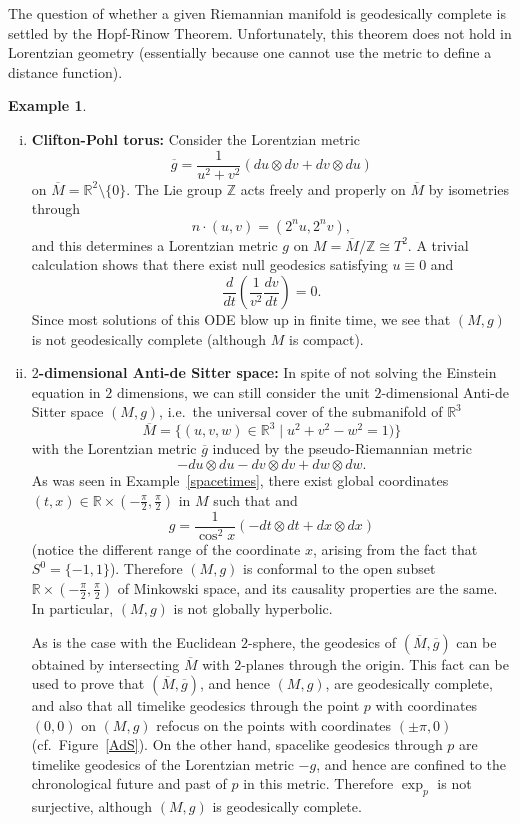 \documentclass[12pt]{amsart}
\newcommand{\bbR}{\mathbb{R}}      %
\newcommand{\bbZ}{\mathbb{Z}}      %
\theoremstyle{definition}
\newtheorem{Example}[Thm]{Example}
\theoremstyle{remark}
\begin{document}
The question of whether a given Riemannian manifold is geodesically complete is settled by the Hopf-Rinow Theorem. Unfortunately, this theorem does not hold in Lorentzian geometry (essentially because one cannot use the metric to define a distance function). 

\begin{Example} \hspace{1cm} \label{Hopf-Rinow}
\begin{enumerate}[(i)]
\item {\bf Clifton-Pohl torus:} Consider the Lorentzian metric
\[
\overline{g} = \frac1{u^2 + v^2} (du \otimes dv + dv \otimes du)
\]
on $\overline{M}=\bbR^2 \setminus \{ 0 \}$. The Lie group $\bbZ$ acts freely and properly on $\overline{M}$ by isometries through 
\[
n \cdot (u,v) = (2^n u, 2^n v),
\]
and this determines a Lorentzian metric $g$ on $M = \overline{M} / \bbZ \cong T^2$. A trivial calculation shows that there exist null geodesics satisfying $u \equiv 0$ and
\[
\frac{d}{dt}\left( \frac1{v^2} \frac{dv}{dt}\right) = 0.
\]
Since most solutions of this ODE blow up in finite time, we see that $(M,g)$ is not geodesically complete (although $M$ is compact).
\item \label{2dAdS} {\bf $2$-dimensional Anti-de Sitter space:} In spite of not solving the Einstein equation in $2$ dimensions, we can still consider the unit $2$-dimensional Anti-de Sitter space $(M,g)$, i.e.~the universal cover of the submanifold of $\bbR^3$
\[
\overline{M} = \{(u,v,w)\in \bbR^3 \mid u^2+v^2-w^2 = 1 )\}
\]
with the Lorentzian metric $\overline{g}$ induced by the pseudo-Riemannian metric
\[
- du\otimes du - dv\otimes dv + dw\otimes dw.
\]
As was seen in Example~\ref{spacetimes}, there exist global coordinates $(t,x) \in \bbR \times (-\frac\pi2, \frac\pi2)$ in $M$ such that and 
\[
g = \frac1{\cos^2 x} (- dt \otimes dt + dx \otimes dx)
\]
(notice the different range of the coordinate $x$, arising from the fact that $S^0=\{-1,1\}$). Therefore $(M,g)$ is conformal to the open subset $\bbR \times (-\frac\pi2, \frac\pi2)$ of Minkowski space, and its causality properties are the same. In particular, $(M,g)$ is not globally hyperbolic.

As is the case with the Euclidean $2$-sphere, the geodesics of $(\overline{M},\overline{g})$ can be obtained by intersecting $\overline{M}$ with $2$-planes through the origin. This fact can be used to prove that $(\overline{M},\overline{g})$, and hence $(M,g)$, are geodesically complete, and also that all timelike geodesics through the point $p$ with coordinates $(0,0)$ on $(M,g)$ refocus on the points with coordinates $(\pm \pi,0)$ (cf.~Figure~\ref{AdS}). On the other hand, spacelike geodesics through $p$ are timelike geodesics of the Lorentzian metric $-g$, and hence are confined to the chronological future and past of $p$ in this metric. Therefore $\exp_p$ is not surjective, although $(M,g)$ is geodesically complete.


\end{enumerate}
\end{Example}
\end{document}
